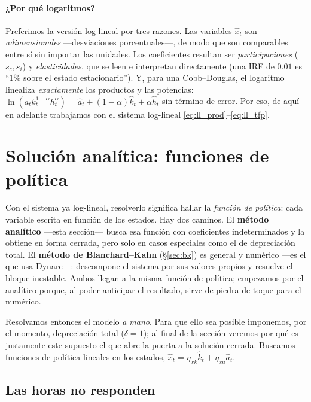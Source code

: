 \documentclass[11pt,a4paper]{report}
\begin{document}
\paragraph{¿Por qué logaritmos?} Preferimos la versión log-lineal por tres razones.
Las variables $\hat{x}_t$ son \emph{adimensionales} ---desviaciones porcentuales---, de
modo que son comparables entre sí sin importar las unidades. Los coeficientes resultan
ser \emph{participaciones} ($s_c,s_i$) y \emph{elasticidades}, que se leen e
interpretan directamente (una IRF de $0.01$ es ``$1\%$ sobre el estado estacionario'').
Y, para una Cobb--Douglas, el logaritmo linealiza \emph{exactamente} los productos y
las potencias: $\ln(a_t k_t^{1-\alpha}h_t^{\alpha})=\hat{a}_t+(1-\alpha)\hat{k}_t
+\alpha\hat{h}_t$ sin término de error. Por eso, de aquí en adelante trabajamos con el
sistema log-lineal \eqref{eq:ll_prod}--\eqref{eq:ll_tfp}.

\section{Solución analítica: funciones de política}
\label{sec:policy}

Con el sistema ya log-lineal, resolverlo significa hallar la \emph{función de
política}: cada variable escrita en función de los estados. Hay dos caminos. El
\textbf{método analítico} ---esta sección--- busca esa función con coeficientes
indeterminados y la obtiene en forma cerrada, pero solo en casos especiales como el de
depreciación total. El \textbf{método de Blanchard--Kahn} (\S\ref{sec:bk}) es general y
numérico ---es el que usa Dynare---: descompone el sistema por sus valores propios y
resuelve el bloque inestable. Ambos llegan a la misma función de política; empezamos
por el analítico porque, al poder anticipar el resultado, sirve de piedra de toque para
el numérico.

Resolvamos entonces el modelo \emph{a mano}. Para que ello sea posible imponemos,
por el momento, depreciación total ($\delta=1$); al final de la sección veremos
por qué es justamente este supuesto el que abre la puerta a la solución cerrada.
Buscamos funciones de política lineales en los estados,
$\hat{x}_t=\eta_{xk}\hat{k}_t+\eta_{xa}\hat{a}_t$.

\subsection{Las horas no responden}
\end{document}
